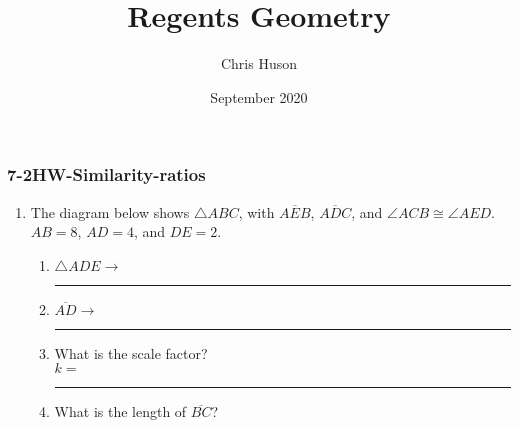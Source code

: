\documentclass[12pt, twoside]{article}
\title{Regents Geometry}
\author{Chris Huson}
\date{September 2020}
\begin{document}
\subsubsection*{7-2HW-Similarity-ratios}
\begin{enumerate}
\item The diagram below shows $\triangle ABC$, with $\overline{AEB}$, $\overline{ADC}$, and $\angle ACB \cong \angle AED$. $AB=8$, $AD=4$, and $DE=2$.
    \begin{multicols}{2}
      \begin{enumerate}
      \item $\triangle ADE \rightarrow$ \rule{2cm}{0.15mm} \vspace{1cm}
      \item $\overline{AD} \rightarrow$ \rule{2cm}{0.15mm} \vspace{1cm}
      \item What is the scale factor?\\[0.5cm] $k=$  \rule{2cm}{0.15mm}
      \item What is the length of $\overline{BC}$?
    \end{enumerate}
    \end{multicols} \vspace{2cm}
    

\end{enumerate}
\end{document}
